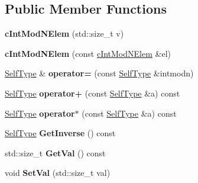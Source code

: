 \subsection*{Public Member Functions}
\begin{DoxyCompactItemize}
\item 
\hypertarget{classcIntModNElem_a93be93aa382c5501b0f36322b24e93db}{{\bfseries c\-Int\-Mod\-N\-Elem} (std\-::size\-\_\-t v)}\label{classcIntModNElem_a93be93aa382c5501b0f36322b24e93db}

\item 
\hypertarget{classcIntModNElem_a878192260976d100695404d0bbc28484}{{\bfseries c\-Int\-Mod\-N\-Elem} (const \hyperlink{classcIntModNElem}{c\-Int\-Mod\-N\-Elem} \&el)}\label{classcIntModNElem_a878192260976d100695404d0bbc28484}

\item 
\hypertarget{classcIntModNElem_a0d0ae718c816556da6fcbf19454c676d}{\hyperlink{classcIntModNElem}{Self\-Type} \& {\bfseries operator=} (const \hyperlink{classcIntModNElem}{Self\-Type} \&intmodn)}\label{classcIntModNElem_a0d0ae718c816556da6fcbf19454c676d}

\item 
\hypertarget{classcIntModNElem_a10093e22457346b333e45f1414739497}{\hyperlink{classcIntModNElem}{Self\-Type} {\bfseries operator+} (const \hyperlink{classcIntModNElem}{Self\-Type} \&a) const }\label{classcIntModNElem_a10093e22457346b333e45f1414739497}

\item 
\hypertarget{classcIntModNElem_adff6836b0b7a20c50b6b9696aea66ca6}{\hyperlink{classcIntModNElem}{Self\-Type} {\bfseries operator$\ast$} (const \hyperlink{classcIntModNElem}{Self\-Type} \&a) const }\label{classcIntModNElem_adff6836b0b7a20c50b6b9696aea66ca6}

\item 
\hypertarget{classcIntModNElem_a641e400e55b454c2832262eabc8442b6}{\hyperlink{classcIntModNElem}{Self\-Type} {\bfseries Get\-Inverse} () const }\label{classcIntModNElem_a641e400e55b454c2832262eabc8442b6}

\item 
\hypertarget{classcIntModNElem_ad584ee8c4e7e57a16963e6cb5cd73c6d}{std\-::size\-\_\-t {\bfseries Get\-Val} () const }\label{classcIntModNElem_ad584ee8c4e7e57a16963e6cb5cd73c6d}

\item 
\hypertarget{classcIntModNElem_ac5d61d5866718ab5062d5030ac44b49e}{void {\bfseries Set\-Val} (std\-::size\-\_\-t val)}\label{classcIntModNElem_ac5d61d5866718ab5062d5030ac44b49e}

\end{DoxyCompactItemize}
